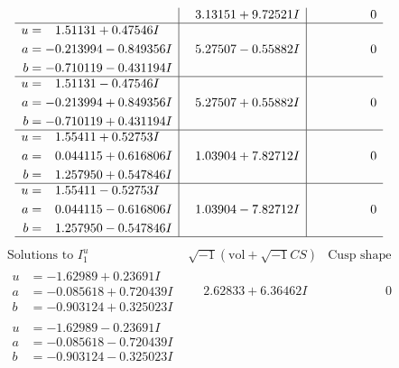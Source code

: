 \documentclass[1p]{elsarticle_modified}
\theoremstyle{definition}
\newcommand{\I}{\sqrt{-1}}
\begin{document}
$$\begin{array}{c|c|c}
 & \phantom{-}3.13151 + 9.72521 I & \phantom{-0.000000 } 0 \\ \hline\begin{aligned}
u &= \phantom{-}1.51131 + 0.47546 I \\
a &= -0.213994 - 0.849356 I \\
b &= -0.710119 - 0.431194 I\end{aligned}
 & \phantom{-}5.27507 - 0.55882 I & \phantom{-0.000000 } 0 \\ \hline\begin{aligned}
u &= \phantom{-}1.51131 - 0.47546 I \\
a &= -0.213994 + 0.849356 I \\
b &= -0.710119 + 0.431194 I\end{aligned}
 & \phantom{-}5.27507 + 0.55882 I & \phantom{-0.000000 } 0 \\ \hline\begin{aligned}
u &= \phantom{-}1.55411 + 0.52753 I \\
a &= \phantom{-}0.044115 + 0.616806 I \\
b &= \phantom{-}1.257950 + 0.547846 I\end{aligned}
 & \phantom{-}1.03904 + 7.82712 I & \phantom{-0.000000 } 0 \\ \hline\begin{aligned}
u &= \phantom{-}1.55411 - 0.52753 I \\
a &= \phantom{-}0.044115 - 0.616806 I \\
b &= \phantom{-}1.257950 - 0.547846 I\end{aligned}
 & \phantom{-}1.03904 - 7.82712 I & \phantom{-0.000000 } 0\\
 \hline 
 \end{array}$$\newpage$$\begin{array}{c|c|c}  
\text{Solutions to }I^u_{1}& \I (\text{vol} + \sqrt{-1}CS) & \text{Cusp shape}\\
 \hline 
\begin{aligned}
u &= -1.62989 + 0.23691 I \\
a &= -0.085618 + 0.720439 I \\
b &= -0.903124 + 0.325023 I\end{aligned}
 & \phantom{-}2.62833 + 6.36462 I & \phantom{-0.000000 } 0 \\ \hline\begin{aligned}
u &= -1.62989 - 0.23691 I \\
a &= -0.085618 - 0.720439 I \\
b &= -0.903124 - 0.325023 I\end{aligned}

\end{array}$$
\end{document}
